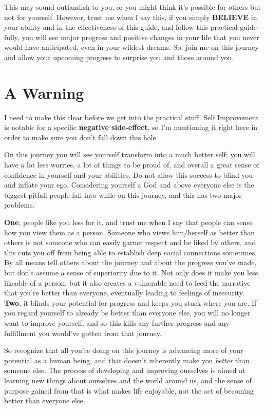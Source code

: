 \documentclass[
]{book}
\begin{document}
This may sound outlandish to you, or you might think it's possible for others but not for yourself. However, trust me when I say this, if you simply \textbf{BELIEVE} in your ability and in the effectiveness of this guide, and follow this practical guide fully, you will see major progress and positive changes in your life that you never would have anticipated, even in your wildest dreams. So, join me on this journey and allow your upcoming progress to surprise you and those around you.

\hypertarget{a-warning}{%
\section{A Warning}\label{a-warning}}

I need to make this clear before we get into the practical stuff. Self Improvement is notable for a specific \textbf{negative side-effect}, so I'm mentioning it right here in order to make sure you don't fall down this hole.

On this journey you will see yourself transform into a much better self; you will have a lot less worries, a lot of things to be proud of, and overall a great sense of confidence in yourself and your abilities. Do not allow this success to blind you and inflate your ego. Considering yourself a God and above everyone else is the biggest pitfall people fall into while on this journey, and this has two major problems.

\textbf{One}, people like you less for it, and trust me when I say that people can sense how you view them as a person. Someone who views him/herself as better than others is not someone who can easily garner respect and be liked by others, and this cuts you off from being able to establish deep social connections sometimes. By all means tell others about the journey and about the progress you've made, but don't assume a sense of superiority due to it. Not only does it make you less likeable of a person, but it also creates a vulnerable need to feed the narrative that you're better than everyone, eventually leading to feelings of insecurity. \textbf{Two}, it blinds your potential for progress and keeps you stuck where you are. If you regard yourself to already be better than everyone else, you will no longer want to improve yourself, and so this kills any further progress and any fulfillment you would've gotten from that journey.

So recognize that all you're doing on this journey is advancing more of your potential as a human being, and that doesn't inherently make you \emph{better} than someone else. The process of developing and improving ourselves is aimed at learning new things about ourselves and the world around us, and the sense of purpose gained from that is what makes life enjoyable, not the act of becoming better than everyone else.
\end{document}
